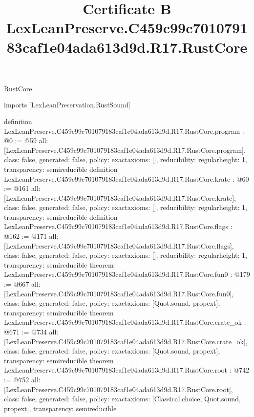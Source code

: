 \begin{lexlean}{RustCore}
\title{Certificate B LexLeanPreserve.C459c99c701079183caf1e04ada613d9d.R17.RustCore}
\begin{coremodule}
imports [LexLeanPreservation.RustSound]

definition LexLeanPreserve.C459c99c701079183caf1e04ada613d9d.R17.RustCore.program : @0 := @59 {
  all: [LexLeanPreserve.C459c99c701079183caf1e04ada613d9d.R17.RustCore.program],
  class: false,
  generated: false,
  policy: exact{axioms: []},
  reducibility: regular{height: 1},
  transparency: semireducible
}
definition LexLeanPreserve.C459c99c701079183caf1e04ada613d9d.R17.RustCore.krate : @60 := @161 {
  all: [LexLeanPreserve.C459c99c701079183caf1e04ada613d9d.R17.RustCore.krate],
  class: false,
  generated: false,
  policy: exact{axioms: []},
  reducibility: regular{height: 1},
  transparency: semireducible
}
definition LexLeanPreserve.C459c99c701079183caf1e04ada613d9d.R17.RustCore.flags : @162 := @171 {
  all: [LexLeanPreserve.C459c99c701079183caf1e04ada613d9d.R17.RustCore.flags],
  class: false,
  generated: false,
  policy: exact{axioms: []},
  reducibility: regular{height: 1},
  transparency: semireducible
}
theorem LexLeanPreserve.C459c99c701079183caf1e04ada613d9d.R17.RustCore.fun0 : @179 := @667 {
  all: [LexLeanPreserve.C459c99c701079183caf1e04ada613d9d.R17.RustCore.fun0],
  class: false,
  generated: false,
  policy: exact{axioms: [Quot.sound, propext]},
  transparency: semireducible
}
theorem LexLeanPreserve.C459c99c701079183caf1e04ada613d9d.R17.RustCore.crate_ok : @671 := @734 {
  all: [LexLeanPreserve.C459c99c701079183caf1e04ada613d9d.R17.RustCore.crate_ok],
  class: false,
  generated: false,
  policy: exact{axioms: [Quot.sound, propext]},
  transparency: semireducible
}
theorem LexLeanPreserve.C459c99c701079183caf1e04ada613d9d.R17.RustCore.root : @742 := @752 {
  all: [LexLeanPreserve.C459c99c701079183caf1e04ada613d9d.R17.RustCore.root],
  class: false,
  generated: false,
  policy: exact{axioms: [Classical.choice, Quot.sound, propext]},
  transparency: semireducible
}


\end{coremodule}
\end{lexlean}
